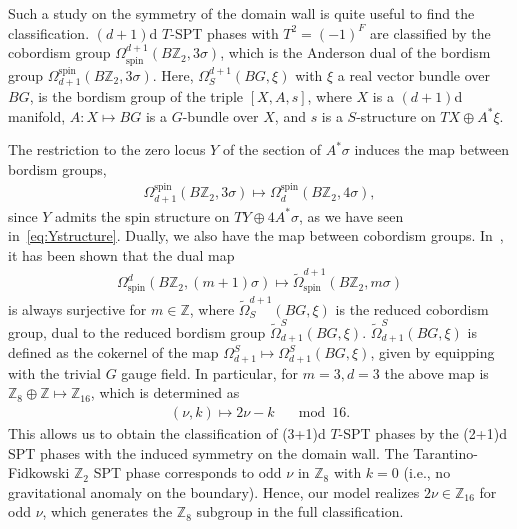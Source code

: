 \documentclass[12pt]{article}
\numberwithin{equation}{section}
\renewcommand{\tilde}{\widetilde}
\begin{document}
Such a study on the symmetry of the domain wall is quite useful to find the classification. $(d+1)$d $T$-SPT phases with $T^2=(-1)^F$ are classified by the cobordism group $\Omega^{d+1}_{\mathrm{spin}}(B\mathbb{Z}_2, 3\sigma)$, which is the Anderson dual of the bordism group $\Omega_{d+1}^{\mathrm{spin}}(B\mathbb{Z}_2, 3\sigma)$. Here, $\Omega^{d+1}_{S}(BG, \xi)$ with $\xi$ a real vector bundle over $BG$, is the bordism group of the triple $[X, A, s]$, where $X$ is a $(d+1)$d manifold, $A: X\mapsto BG$ is a $G$-bundle over $X$, and $s$ is a $S$-structure on $TX\oplus A^*\xi$.

The restriction to the zero locus $Y$ of the section of $A^*\sigma$ induces the map between bordism groups,
\begin{align}
    \Omega_{d+1}^{\mathrm{spin}}(B\mathbb{Z}_2, 3\sigma)\mapsto \Omega_{d}^{\mathrm{spin}}(B\mathbb{Z}_2, 4\sigma),
\end{align}
since $Y$ admits the spin structure on $TY\oplus 4A^*\sigma$, as we have seen in~\eqref{eq:Ystructure}.
Dually, we also have the map between cobordism groups. In~\cite{HKT2019CPT}, it has been shown that the dual map
\begin{align}
    \Omega^{d}_{\mathrm{spin}}(B\mathbb{Z}_2, (m+1)\sigma)\mapsto \tilde{\Omega}^{d+1}_{\mathrm{spin}}(B\mathbb{Z}_2, m\sigma)
    \label{eq:smith}
\end{align}
is always surjective for $m\in\mathbb{Z}$, where $\tilde{\Omega}^{d+1}_{S}(BG, \xi)$ is the reduced cobordism group, dual to the reduced bordism group $\tilde{\Omega}_{d+1}^{S}(BG, \xi)$. $\tilde{\Omega}_{d+1}^{S}(BG, \xi)$ is defined as the cokernel of the map $\Omega_{d+1}^{S}\mapsto\Omega_{d+1}^{S}(BG, \xi)$, given by equipping with the trivial $G$ gauge field.
In particular, for $m=3, d=3$ the above map is $\mathbb{Z}_8\oplus\mathbb{Z}\mapsto\mathbb{Z}_{16}$, which is determined as~\cite{HKT2019CPT}
\begin{align}
    (\nu, k)\mapsto 2\nu-k \quad \mod 16.
\end{align}
This allows us to obtain the classification of (3+1)d $T$-SPT phases by the (2+1)d SPT phases with the induced symmetry on the domain wall. The Tarantino-Fidkowski $\mathbb{Z}_2$ SPT phase corresponds to odd $\nu$ in $\mathbb{Z}_8$ with $k=0$ (i.e., no gravitational anomaly on the boundary). Hence, our model realizes $2\nu\in \mathbb{Z}_{16}$ for odd $\nu$, which generates the $\mathbb{Z}_8$ subgroup in the full classification.
\end{document}
